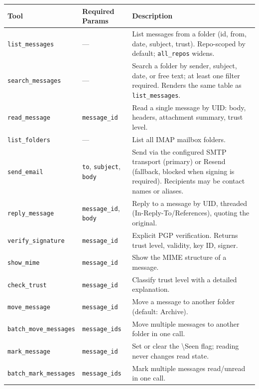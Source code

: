 \documentclass[a4paper,10pt,fleqn]{article}
\begin{document}
\begin{center}
\begin{longtable}{@{}llp{6cm}@{}}
\toprule
\textbf{Tool} & \textbf{Required Params} & \textbf{Description} \\
\midrule
\texttt{list\_messages}       & ---                            & List messages from a folder (id, from, date, subject, trust). Repo-scoped by default; \texttt{all\_repos} widens. \\
\texttt{search\_messages}     & ---                            & Search a folder by sender, subject, date, or free text; at least one filter required. Renders the same table as \texttt{list\_messages}. \\
\texttt{read\_message}        & \texttt{message\_id}           & Read a single message by UID: body, headers, attachment summary, trust level. \\
\texttt{list\_folders}        & ---                            & List all IMAP mailbox folders. \\
\texttt{send\_email}          & \texttt{to}, \texttt{subject}, \texttt{body} & Send via the configured SMTP transport (primary) or Resend (fallback, blocked when signing is required). Recipients may be contact names or aliases. \\
\texttt{reply\_message}       & \texttt{message\_id}, \texttt{body} & Reply to a message by UID, threaded (In-Reply-To/References), quoting the original. \\
\texttt{verify\_signature}    & \texttt{message\_id}           & Explicit PGP verification. Returns trust level, validity, key ID, signer. \\
\texttt{show\_mime}           & \texttt{message\_id}           & Show the MIME structure of a message. \\
\texttt{check\_trust}         & \texttt{message\_id}           & Classify trust level with a detailed explanation. \\
\texttt{move\_message}        & \texttt{message\_id}           & Move a message to another folder (default: Archive). \\
\texttt{batch\_move\_messages} & \texttt{message\_ids}          & Move multiple messages to another folder in one call. \\
\texttt{mark\_message}        & \texttt{message\_id}           & Set or clear the \textbackslash{}Seen flag; reading never changes read state. \\
\texttt{batch\_mark\_messages} & \texttt{message\_ids}          & Mark multiple messages read/unread in one call. \\

\end{longtable}
\end{center}
\end{document}
